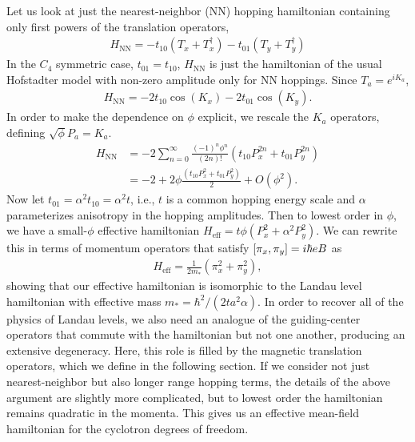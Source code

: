 \documentclass[aps,prb,twocolumn,letterpaper,twoside,nobalancelastpage,groupedaddress,amsmath,amssymb,floatfix,citeautoscript]{revtex4-1}
\begin{document}
Let us look at just the nearest-neighbor (NN) hopping hamiltonian containing only first powers of the translation operators,
\begin{align*}
H_{\text{NN}} = -t_{10}\left(T_x + T_x^{\dag}\right) - t_{01}\left(T_y + T_y^{\dag}\right)
\end{align*}
In the $C_4$ symmetric case, $t_{01} = t_{10}$, $H_{\text{NN}}$ is just the hamiltonian of the usual Hofstadter model with non-zero amplitude only for NN hoppings. Since $T_a = e^{iK_a}$,
\begin{align*}
H_{\text{NN}}= -2t_{10}\cos\left(K_x\right) - 2 t_{01}\cos\left(K_y\right).
\end{align*}
In order to make the dependence on $\phi$ explicit, we rescale the $K_a$ operators, defining $\sqrt{\phi} P_a = K_a$. 
\begin{align*}
H_{\text{NN}} &= -2\sum_{n=0}^{\infty}  \frac{(-1)^{n}\phi^{n}}{(2n)!} \left(t_{10} P^{2n}_x + t_{01}P^{2n}_y\right)\\
&= -2 + 2\phi\frac{\left(t_{10} P^{2}_x + t_{01} P^{2}_y\right)}{2} +O(\phi^2).
\end{align*}
Now let $t_{01} = \alpha^2 t_{10} = \alpha^2 t$, i.e., $t$ is a common hopping energy scale and $\alpha$ parameterizes anisotropy in the hopping amplitudes. Then to lowest order in $\phi$, we have a small-$\phi$ effective hamiltonian $H_{\text{eff}}= t\phi \left(P^{2}_x + \alpha^2P^{2}_y\right)$. We can rewrite this in terms of momentum operators that satisfy $\comm{\pi_x}{\pi_y} = i\hbar e B$ as
\begin{align*}
H_{\text{eff}} = \frac{1}{2m_{\ast}}\left(\pi_x^2 + \pi_y^2\right),
\end{align*}
showing that our effective hamiltonian is isomorphic to the Landau level hamiltonian with effective mass $m_{\ast} = \hbar^2/(2ta^2\alpha)$. In order to recover all of the physics of Landau levels, we also need an analogue of the guiding-center operators that commute with the hamiltonian but not one another, producing an extensive degeneracy. Here, this role is filled by the magnetic translation operators, which we define in the following section. If we consider not just nearest-neighbor but also longer range hopping terms, the details of the above argument are slightly more complicated, but to lowest order the hamiltonian remains quadratic in the momenta. This gives us an effective mean-field hamiltonian for the cyclotron degrees of freedom. 
\end{document}
